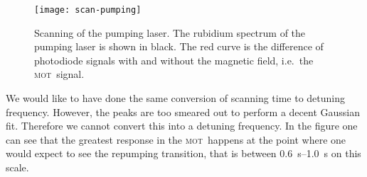 \documentclass[11pt, english, fleqn, DIV=15, headinclude, BCOR=2cm]{scrreprt}
\newcommand\mot{\textsc{mot}}
\begin{document}
\begin{figure}
    \centering
    \texttt{[image: scan-pumping]}
    \caption{%
        Scanning of the pumping laser. The rubidium spectrum of the pumping
        laser is shown in black. The red curve is the difference of photodiode
        signals with and without the magnetic field, i.e.\ the \mot\ signal.
    }
    \label{fig:scan-pumping}
\end{figure}

We would like to have done the same conversion of scanning time to detuning
frequency. However, the peaks are too smeared out to perform a decent Gaussian
fit. Therefore we cannot convert this into a detuning frequency.
In the figure one can see that the greatest response in the \mot\ happens at
the point where one would expect to see the repumping transition, that is
between \SIrange{0.6}{1.0}{\second} on this scale.
\end{document}
